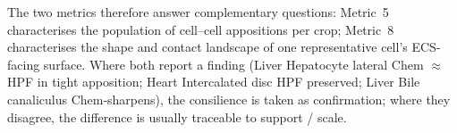 The two metrics therefore answer complementary questions: Metric~5
characterises the population of cell--cell appositions per crop;
Metric~8 characterises the shape and contact landscape of one
representative cell's ECS-facing surface. Where both report a
finding (Liver Hepatocyte lateral Chem $\approx$ HPF in tight
apposition; Heart Intercalated disc HPF preserved; Liver Bile
canaliculus Chem-sharpens), the consilience is taken as
confirmation; where they disagree, the difference is usually
traceable to support / scale.

